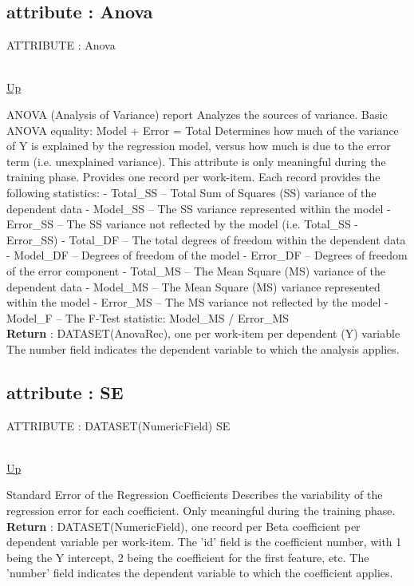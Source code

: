 \subsection*{attribute : Anova}
\hypertarget{ecldoc:linearregression.ols.anova}{ATTRIBUTE : Anova} \\
\hyperlink{ecldoc:linearregression.ols}{Up} \\
\par
ANOVA (Analysis of Variance) report Analyzes the sources of variance. Basic ANOVA equality: Model + Error = Total Determines how much of the variance of Y is explained by the regression model, versus how much is due to the error term (i.e. unexplained variance). This attribute is only meaningful during the training phase. Provides one record per work-item. Each record provides the following statistics: - Total\_SS -- Total Sum of Squares (SS) variance of the dependent data - Model\_SS -- The SS variance represented within the model - Error\_SS -- The SS variance not reflected by the model (i.e. Total\_SS - Error\_SS) - Total\_DF -- The total degrees of freedom within the dependent data - Model\_DF -- Degrees of freedom of the model - Error\_DF -- Degrees of freedom of the error component - Total\_MS -- The Mean Square (MS) variance of the dependent data - Model\_MS -- The Mean Square (MS) variance represented within the model - Error\_MS -- The MS variance not reflected by the model - Model\_F -- The F-Test statistic: Model\_MS / Error\_MS \\
\textbf{Return} : DATASET(AnovaRec), one per work-item per dependent (Y) variable The number field indicates the dependent variable to which the analysis applies. \\
\subsection*{attribute : SE}
\hypertarget{ecldoc:linearregression.ols.se}{ATTRIBUTE : DATASET(NumericField) SE} \\
\hyperlink{ecldoc:linearregression.ols}{Up} \\
\par
Standard Error of the Regression Coefficients Describes the variability of the regression error for each coefficient. Only meaningful during the training phase. \\
\textbf{Return} : DATASET(NumericField), one record per Beta coefficient per dependent variable per work-item. The 'id' field is the coefficient number, with 1 being the Y intercept, 2 being the coefficient for the first feature, etc. The 'number' field indicates the dependent variable to which the coefficient applies. \\
